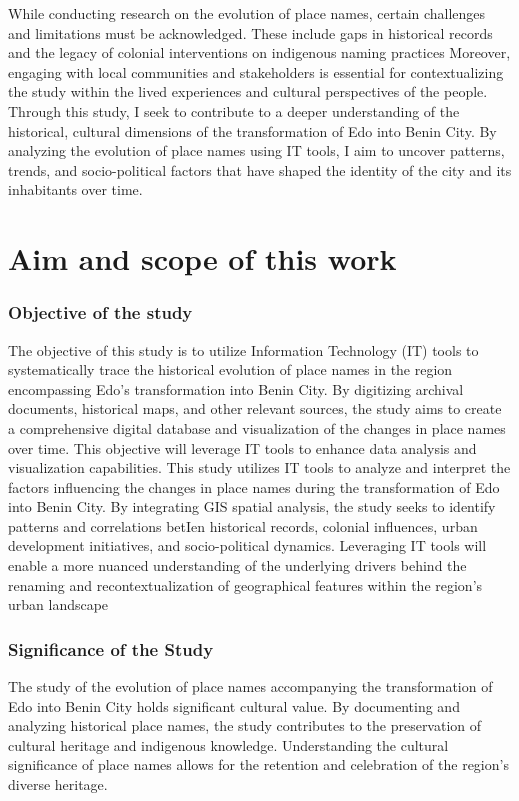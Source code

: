 While conducting research on the evolution of place names, certain challenges and limitations must be acknowledged. These include gaps in historical records and the legacy of colonial interventions on indigenous naming practices Moreover, engaging with local communities and stakeholders is essential for contextualizing the study within the lived experiences and cultural perspectives of the people.
Through this study, I seek to contribute to a deeper understanding of the historical, cultural dimensions of the transformation of Edo into Benin City. By analyzing the evolution of place names using IT tools, I aim to uncover patterns, trends, and socio-political factors that have shaped the identity of the city and its inhabitants over time.

\section{Aim and scope of this work}
\subsubsection{Objective of the study}
The objective of this study is to utilize Information Technology (IT) tools to systematically trace the historical evolution of place names in the region encompassing Edo's transformation into Benin City. By digitizing archival documents, historical maps, and other relevant sources, the study aims to create a comprehensive digital database and visualization of the changes in place names over time. This objective will leverage IT tools to enhance data analysis and visualization capabilities.
This study utilizes IT tools to analyze and interpret the factors influencing the changes in place names during the transformation of Edo into Benin City. By integrating GIS spatial analysis, the study seeks to identify patterns and correlations betIen historical records, colonial influences, urban development initiatives, and socio-political dynamics. Leveraging IT tools will enable a more nuanced understanding of the underlying drivers behind the renaming and recontextualization of geographical features within the region's urban landscape
\subsubsection{Significance of the Study}
The study of the evolution of place names accompanying the transformation of Edo into Benin City holds significant cultural value. By documenting and analyzing historical place names, the study contributes to the preservation of cultural heritage and indigenous knowledge. Understanding the cultural significance of place names allows for the retention and celebration of the region's diverse heritage. 

